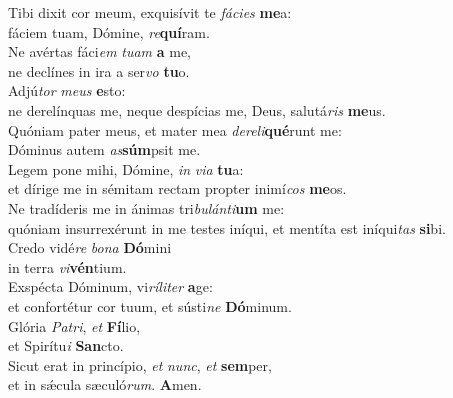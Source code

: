 \oddverse Tibi dixit cor meum, exquisívit te \textit{fá}\textit{ci}\textit{es} \textbf{me}a:~\*\\
\oddverse fáciem tuam, Dómine, \textit{re}\textbf{quí}ram.\\
\evenverse Ne avértas fáci\textit{em} \textit{tu}\textit{am} \textbf{a} me,~\*\\
\evenverse ne declínes in ira a ser\textit{vo} \textbf{tu}o.\\
\oddverse Adjú\textit{tor} \textit{me}\textit{us} \textbf{e}sto:~\*\\
\oddverse ne derelínquas me, neque despícias me, Deus, salutá\textit{ris} \textbf{me}us.\\
\evenverse Quóniam pater meus, et mater mea \textit{de}\textit{re}\textit{li}\textbf{qué}runt me:~\*\\
\evenverse Dóminus autem \textit{as}\textbf{súm}psit me.\\
\oddverse Legem pone mihi, Dómine, \textit{in} \textit{vi}\textit{a} \textbf{tu}a:~\*\\
\oddverse et dírige me in sémitam rectam propter inimí\textit{cos} \textbf{me}os.\\
\evenverse Ne tradíderis me in ánimas tri\textit{bu}\textit{lán}\textit{ti}\textbf{um} me:~\*\\
\evenverse quóniam insurrexérunt in me testes iníqui, et mentíta est iníqui\textit{tas} \textbf{si}bi.\\
\oddverse Credo vidé\textit{re} \textit{bo}\textit{na} \textbf{Dó}mini~\*\\
\oddverse in terra \textit{vi}\textbf{vén}tium.\\
\evenverse Exspécta Dóminum, vi\textit{rí}\textit{li}\textit{ter} \textbf{a}ge:~\*\\
\evenverse et confortétur cor tuum, et sústi\textit{ne} \textbf{Dó}minum.\\
\oddverse Glória \textit{Pa}\textit{tri}, \textit{et} \textbf{Fí}lio,~\*\\
\oddverse et Spirítu\textit{i} \textbf{San}cto.\\
\evenverse Sicut erat in princípio, \textit{et} \textit{nunc}, \textit{et} \textbf{sem}per,~\*\\
\evenverse et in sǽcula sæculó\textit{rum}. \textbf{A}men.\\
